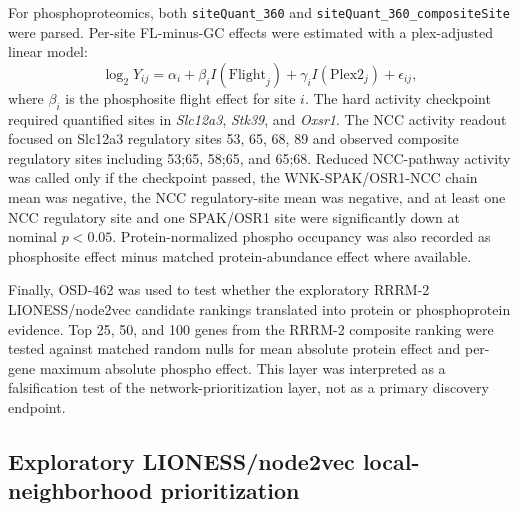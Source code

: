 \documentclass[11pt]{article}
\newcommand{\code}[1]{\texttt{#1}}
\newcommand{\gene}[1]{\textit{#1}}
\begin{document}
For phosphoproteomics, both \code{siteQuant\_360} and \code{siteQuant\_360\_compositeSite} were parsed. Per-site FL-minus-GC effects were estimated with a plex-adjusted linear model:
\begin{equation}
\log_2 Y_{ij} = \alpha_i+\beta_i I(\mathrm{Flight}_j)+\gamma_i I(\mathrm{Plex2}_j)+\epsilon_{ij},
\end{equation}
where $\beta_i$ is the phosphosite flight effect for site $i$. The hard activity checkpoint required quantified sites in \gene{Slc12a3}, \gene{Stk39}, and \gene{Oxsr1}. The NCC activity readout focused on Slc12a3 regulatory sites 53, 65, 68, 89 and observed composite regulatory sites including 53;65, 58;65, and 65;68. Reduced NCC-pathway activity was called only if the checkpoint passed, the WNK-SPAK/OSR1-NCC chain mean was negative, the NCC regulatory-site mean was negative, and at least one NCC regulatory site and one SPAK/OSR1 site were significantly down at nominal $p<0.05$. Protein-normalized phospho occupancy was also recorded as phosphosite effect minus matched protein-abundance effect where available.

Finally, OSD-462 was used to test whether the exploratory RRRM-2 LIONESS/node2vec candidate rankings translated into protein or phosphoprotein evidence. Top 25, 50, and 100 genes from the RRRM-2 composite ranking were tested against matched random nulls for mean absolute protein effect and per-gene maximum absolute phospho effect. This layer was interpreted as a falsification test of the network-prioritization layer, not as a primary discovery endpoint.

\subsection{Exploratory LIONESS/node2vec local-neighborhood prioritization}
\end{document}
